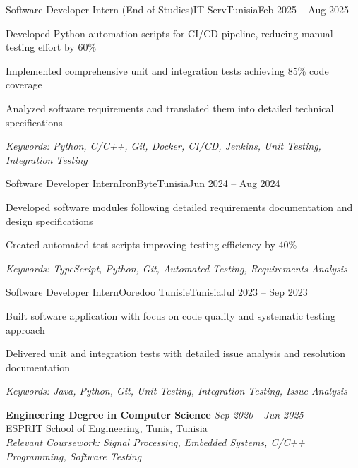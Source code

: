 \documentclass[11pt,a4paper]{article}
\begin{document}
\makecvheader
\makecontactinfo


\begin{internship}{Software Developer Intern (End-of-Studies)}{IT Serv}{Tunisia}{Feb 2025 -- Aug 2025}{}
  \item Developed Python automation scripts for CI/CD pipeline, reducing manual testing effort by 60\%
  \item Implemented comprehensive unit and integration tests achieving 85\% code coverage
  \item Analyzed software requirements and translated them into detailed technical specifications
  \item[] \textit{\footnotesize Keywords: Python, C/C++, Git, Docker, CI/CD, Jenkins, Unit Testing, Integration Testing}
\end{internship}

\begin{internship}{Software Developer Intern}{IronByte}{Tunisia}{Jun 2024 -- Aug 2024}{}
  \item Developed software modules following detailed requirements documentation and design specifications
  \item Created automated test scripts improving testing efficiency by 40\%
  \item[] \textit{\footnotesize Keywords: TypeScript, Python, Git, Automated Testing, Requirements Analysis}
\end{internship}

\begin{internship}{Software Developer Intern}{Ooredoo Tunisie}{Tunisia}{Jul 2023 -- Sep 2023}{}
  \item Built software application with focus on code quality and systematic testing approach
  \item Delivered unit and integration tests with detailed issue analysis and resolution documentation
  \item[] \textit{\footnotesize Keywords: Java, Python, Git, Unit Testing, Integration Testing, Issue Analysis}
\end{internship}

\textbf{Engineering Degree in Computer Science} \hfill \textit{Sep 2020 - Jun 2025}\\[-2pt]
ESPRIT School of Engineering, Tunis, Tunisia\\[2pt]
\textit{Relevant Coursework: Signal Processing, Embedded Systems, C/C++ Programming, Software Testing}
\end{document}

